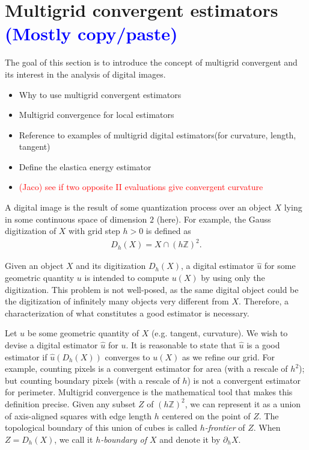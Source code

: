 \documentclass[runningheads]{llncs}
\newcommand{\todo}[1]{{\textcolor{blue}{#1}}}
\newcommand{\test}[1]{{\textcolor{red}{#1}}}
\begin{document}
\section{Multigrid convergent estimators \todo{(Mostly copy/paste)}}
The goal of this section is to  introduce the concept of multigrid convergent and its interest in the analysis of digital images.
\begin{itemize}
	\item{Why to use multigrid convergent estimators}
	\item{Multigrid convergence for local estimators}
	\item{Reference to examples of multigrid digital estimators(for curvature, length, tangent)}
	\item{Define the elastica energy estimator}
	\item{\test{(Jaco) see if two opposite II evaluations give convergent curvature}}
\end{itemize}

\hrulefill

A digital image is the result of some quantization process over an object $X$ lying in some continuous space of
dimension $2$ (here).  For example, the Gauss digitization of $X$ with grid step $h>0$ is defined as
\begin{align*}
	D_h(X) = X \cap (h\mathbb{Z})^2.
\end{align*} 

Given an object $X$ and its digitization $D_h(X)$, a digital estimator $\hat{u}$ for some geometric quantity $u$ is
intended to compute $u(X)$ by using only the digitization. This problem is not well-posed, as the same digital object
could be the digitization of infinitely many objects very different from $X$. Therefore, a characterization of what constitutes
a good estimator is necessary.

Let $u$ be some geometric quantity of $X$ (e.g. tangent, curvature). We wish to devise a digital estimator $\hat{u}$ for
$u$. It is reasonable to state that $\hat{u}$ is a good estimator if $\hat{u}(D_h(X))$ converges to $u(X)$ as we refine
our grid. For example, counting pixels is a convergent estimator for area (with a rescale of $h^2$); but counting
boundary pixels (with a rescale of $h$) is not a convergent estimator for perimeter. Multigrid convergence is the
mathematical tool that makes this definition precise. Given any subset $Z$ of $(h\mathbb{Z})^2$, we can represent it as a
union of axis-aligned squares with edge length $h$ centered on the point of $Z$. The topological boundary of this union
of cubes is called {\em $h$-frontier} of $Z$. When $Z=D_h(X)$, we call it {\em $h$-boundary of $X$} and denote it by
$\partial_h X$.
\end{document}
